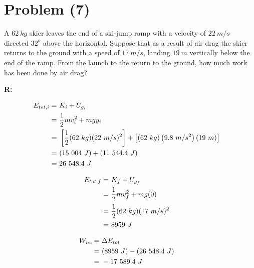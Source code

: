 \section{Problem (7)}
	A $62 \ kg$ skier leaves the end of a ski-jump ramp with a velocity of $22 \ m/s$ directed $32^{o}$ above the horizontal. Suppose that as a result of air drag the skier returns to the ground with a speed of $17 \ m/s$, landing $19 \ m$ vertically below the end of the ramp. From the launch to the return to the ground, how much work has been done by air drag?

	\textbf{R:}

	\begin{align}
		E_{tot,i} = \ &K_{i} + U_{g_{i}}& \notag \\
		= \ &\frac{1}{2}mv_{i}^{2} + mgy_{i}& \notag \\
		= \ &\left[\frac{1}{2}(62 \ kg)(22 \ m/s)^{2}\right] + \left[(62 \ kg)\left(9.8 \ m/s^{2}\right)(19 \ m)\right]& \notag \\
		= \ &(15 \ 004 \ J) + (11 \ 544.4 \ J)& \notag \\
		= \ &26 \ 548.4 \ J& \notag
	\end{align}

	\begin{align}
		E_{tot,f} = \ &K_{f} + U_{g_{f}}& \notag \\
		= \ &\frac{1}{2}mv_{f}^{2} + mg(0)& \notag \\
		= \ &\frac{1}{2}(62 \ kg)(17 \ m/s)^{2} \notag \\
		= \ &8959 \ J& \notag
	\end{align}

	\begin{align}
		W_{nc} = \ &\Delta E_{tot}& \notag \\
		= \ &(8959 \ J) - (26 \ 548.4 \ J)& \notag \\
		= \ &- 17 \ 589.4 \ J&
	\end{align}
